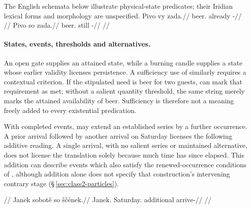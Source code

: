 

The English schemata below illustrate physical-state predicates; their
Iridian lexical forms and morphology are unspecified.
\pex
\a {}
\a {}
\a {}
\a {}
\a
\begingl
\gla Pivo vy zada.//
\glb beer.\Dir{} already \NegExst{}-\Cont{}//
\glft {} //
\endgl
\a
\begingl
\gla Pivo so zada.//
\glb beer.\Dir{} still \NegExst{}-\Cont{}//
\glft {} //
\endgl
\xe

\paragraph{States, events, thresholds and alternatives.}
An open gate supplies an attained state, while a burning candle supplies
a state whose earlier validity licenses persistence. A sufficiency use of
 similarly requires a contextual criterion. If the stipulated need is
beer for two guests,  
can mark that requirement as met; without a salient quantity threshold, the
same string merely marks the attained availability of beer. Sufficiency is
therefore not a meaning freely added to every existential predication.

With completed events,  may extend an established series by a further
occurrence. A prior arrival followed by another arrival on Saturday licenses
the following additive reading. A single arrival, with no salient series or
maintained alternative, does not license the translation solely because much
time has since elapsed. This addition can describe events which also satisfy
the renewed-occurrence conditions of , although addition alone
does not specify that construction's intervening contrary stage
(§\,\ref{sec:class2-particles}).

\pex
\begingl
\glpreamble {}//
\gla Janek sobotě so ščének.//
\glb Janek.\Dir{} Saturday.\Ind{} additional arrive-\Pf{}//
\glft {}//
\endgl
\xe

